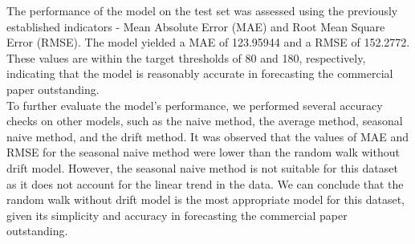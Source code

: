 The performance of the model on the test set was assessed using the previously established indicators - Mean Absolute Error (MAE) and Root Mean Square Error (RMSE).
The model yielded a MAE of 123.95944 and a RMSE of 152.2772.
These values are within the target thresholds of 80 and 180, respectively, indicating that the model is reasonably accurate in forecasting the commercial paper outstanding.\\

To further evaluate the model's performance, we performed several accuracy checks on other models, such as the naive method, the average method, seasonal naive method, and the drift method.
It was observed that the values of MAE and RMSE for the seasonal naive method were lower than the random walk without drift model.
However, the seasonal naive method is not suitable for this dataset as it does not account for the linear trend in the data.
We can conclude that the random walk without drift model is the most appropriate model for this dataset, given its simplicity and accuracy in forecasting the commercial paper outstanding.
